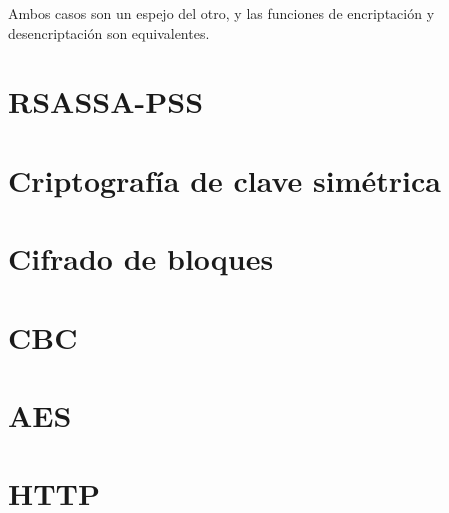  Ambos casos son un espejo del otro, y las funciones de encriptación y desencriptación son equivalentes. \emph{\parencite{Reference12}}


 \section{RSASSA-PSS}


 \section{Criptografía de clave simétrica}


 \section{Cifrado de bloques}


 \section{CBC}


 \section{AES}


 \section{HTTP}
